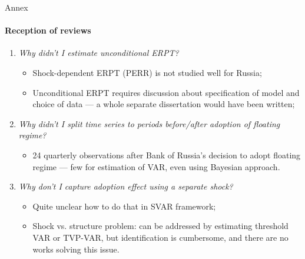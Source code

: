 \documentclass{beamer}
\begin{document}
\begin{frame}[noframenumbering]{Annex}
	\framesubtitle{Reception of reviews}
	\label{reception}
	\begin{enumerate}
		\item \textit{Why didn't I estimate unconditional ERPT?}
		\begin{itemize}
			\item Shock-dependent ERPT (PERR) is not studied well for Russia;
			\item Unconditional ERPT requires discussion about specification of model and choice of data --- a whole separate dissertation would have been written;
		\end{itemize}
		\item \textit{Why didn't I split time series to periods before/after adoption of floating regime?}
		\begin{itemize}
			\item 24 quarterly observations after Bank of Russia's decision to adopt floating regime --- few for estimation of VAR, even using Bayesian approach.
		\end{itemize}
		\item \textit{Why don't I capture adoption effect using a separate shock?}
		\begin{itemize}
			\item Quite unclear how to do that in SVAR framework;
			\item Shock vs. structure problem: can be addressed by estimating threshold VAR or TVP-VAR, but identification is cumbersome, and there are no works solving this issue.
		\end{itemize}
	\end{enumerate}
  
\end{frame}
\end{document}
